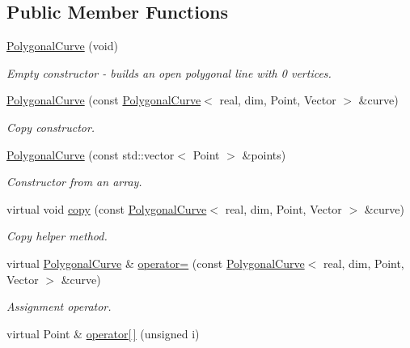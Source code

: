 \subsection*{Public Member Functions}
\begin{DoxyCompactItemize}
\item 
\hypertarget{classPolygonalCurve_ad49440d5abf4e7d611a08199614946f6}{
\hyperlink{classPolygonalCurve_ad49440d5abf4e7d611a08199614946f6}{PolygonalCurve} (void)}
\label{classPolygonalCurve_ad49440d5abf4e7d611a08199614946f6}

\begin{DoxyCompactList}\small\item\em Empty constructor -\/ builds an open polygonal line with 0 vertices. \end{DoxyCompactList}\item 
\hyperlink{classPolygonalCurve_a765f9ed20f08082f9472163690e3626d}{PolygonalCurve} (const \hyperlink{classPolygonalCurve}{PolygonalCurve}$<$ real, dim, Point, Vector $>$ \&curve)
\begin{DoxyCompactList}\small\item\em Copy constructor. \end{DoxyCompactList}\item 
\hyperlink{classPolygonalCurve_aafe300222bd47264321282b3ff4a1df5}{PolygonalCurve} (const std::vector$<$ Point $>$ \&points)
\begin{DoxyCompactList}\small\item\em Constructor from an array. \end{DoxyCompactList}\item 
virtual void \hyperlink{classPolygonalCurve_a3613ee4e2236f63c266e2366c4c28dd2}{copy} (const \hyperlink{classPolygonalCurve}{PolygonalCurve}$<$ real, dim, Point, Vector $>$ \&curve)
\begin{DoxyCompactList}\small\item\em Copy helper method. \end{DoxyCompactList}\item 
virtual \hyperlink{classPolygonalCurve}{PolygonalCurve} \& \hyperlink{classPolygonalCurve_ac7a5c51ecf180237723091daa1265f1b}{operator=} (const \hyperlink{classPolygonalCurve}{PolygonalCurve}$<$ real, dim, Point, Vector $>$ \&curve)
\begin{DoxyCompactList}\small\item\em Assignment operator. \end{DoxyCompactList}\item 
virtual Point \& \hyperlink{classPolygonalCurve_a46374e7c2d60d51f504cd949ef691abb}{operator\mbox{[}$\,$\mbox{]}} (unsigned i)

\end{DoxyCompactItemize}
